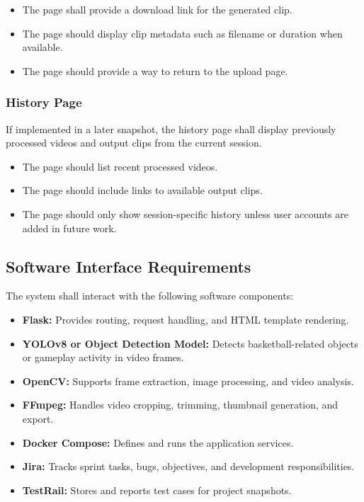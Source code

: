 \documentclass[12pt]{article}
\begin{document}
\begin{itemize}[noitemsep]
    \item The page shall provide a download link for the generated clip.
    \item The page should display clip metadata such as filename or duration when available.
    \item The page should provide a way to return to the upload page.
\end{itemize}

\subsubsection{History Page}
If implemented in a later snapshot, the history page shall display previously processed videos and output clips from the current session.

\begin{itemize}[noitemsep]
    \item The page should list recent processed videos.
    \item The page should include links to available output clips.
    \item The page should only show session-specific history unless user accounts are added in future work.
\end{itemize}

\subsection{Software Interface Requirements}
The system shall interact with the following software components:
\begin{itemize}[noitemsep]
    \item \textbf{Flask:} Provides routing, request handling, and HTML template rendering.
    \item \textbf{YOLOv8 or Object Detection Model:} Detects basketball-related objects or gameplay activity in video frames.
    \item \textbf{OpenCV:} Supports frame extraction, image processing, and video analysis.
    \item \textbf{FFmpeg:} Handles video cropping, trimming, thumbnail generation, and export.
    \item \textbf{Docker Compose:} Defines and runs the application services.
    \item \textbf{Jira:} Tracks sprint tasks, bugs, objectives, and development responsibilities.
    \item \textbf{TestRail:} Stores and reports test cases for project snapshots.
\end{itemize}
\end{document}
